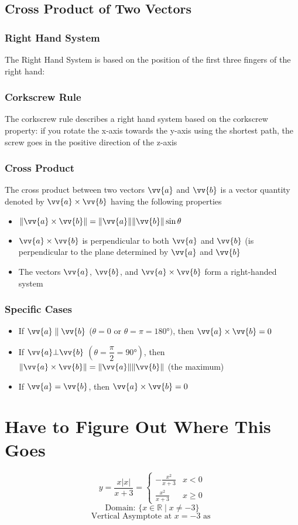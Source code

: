 \documentclass{article}
\newcommand{\mv}[1]{
	\lVert\vv{#1}\rVert
}
\begin{document}
	\subsection{Cross Product of Two Vectors}
	\subsubsection{Right Hand System}
	The Right Hand System is based on the position of the first three fingers of the right hand: %
	\subsubsection{Corkscrew Rule}
	The corkscrew rule describes a right hand system based on the corkscrew property: if you rotate the x-axis towards the y-axis using the shortest path, the screw goes in the positive direction of the z-axis
	\subsubsection{Cross Product}
	The cross product between two vectors $\vv{a}$ and $\vv{b}$ is a vector quantity denoted by $\vv{a}\times\vv{b}$ having the following properties
	\begin{itemize}
		\item $\lVert\vv{a}\times\vv{b}\rVert=\mv{a}\mv{b}\sin\theta$
		\item $\vv{a}\times\vv{b}$ is perpendicular to both $\vv{a}$ and $\vv{b}$ (is perpendicular to the plane determined by $\vv{a}$ and $\vv{b}$
		\item The vectors $\vv{a}$, $\vv{b}$, and $\vv{a}\times\vv{b}$ form a right-handed system
	\end{itemize}
	\subsubsection{Specific Cases}
	\begin{itemize}
		\item If $\vv{a}\parallel\vv{b}$ ($\theta=0$ or $\theta=\pi=\ang{180})$, then $\vv{a}\times\vv{b}=0$
		\item If $\vv{a}\bot\vv{b}$ $\left(\theta=\dfrac{\pi}{2}=\ang{90}\right)$, then $\lVert\vv{a}\times\vv{b}\rVert=\mv{a}\mv{b}$ (the maximum)
		\item If $\vv{a}=\vv{b}$, then $\vv{a}\times\vv{b}=0$
	\end{itemize}
	
	
	
	\section{Have to Figure Out Where This Goes}
	\[y=\frac{x|x|}{x+3}=\begin{cases}
		-\frac{x^2}{x+3}&x<0\\
		\frac{x^2}{x+3}&x\geq0
	\end{cases}\]
	\[\text{Domain: }\{x\in\mathbb{R}\mid x\neq-3\}\]
	\[\text{Vertical Asymptote at }x=-3\text{ as }\]
	
\end{document}
